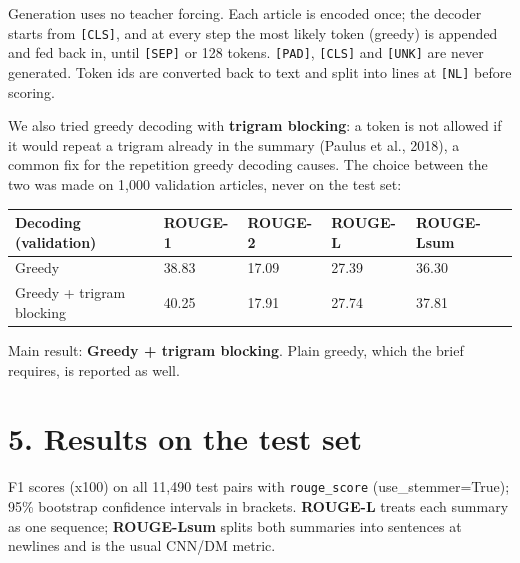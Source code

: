 \documentclass[10pt,a4paper]{article}
\begin{document}
Generation uses no teacher forcing. Each article is encoded once; the decoder starts from \texttt{{[}CLS{]}}, and at every step the most likely token (greedy) is appended and fed back in, until \texttt{{[}SEP{]}} or 128 tokens. \texttt{{[}PAD{]}}, \texttt{{[}CLS{]}} and \texttt{{[}UNK{]}} are never generated. Token ids are converted back to text and split into lines at \texttt{{[}NL{]}} before scoring.

We also tried greedy decoding with \textbf{trigram blocking}: a token is not allowed if it would repeat a trigram already in the summary (Paulus et al., 2018), a common fix for the repetition greedy decoding causes. The choice between the two was made on 1,000 validation articles, never on the test set:

\begin{longtable}[]{@{}lllll@{}}
\toprule\noalign{}
Decoding (validation) & ROUGE-1 & ROUGE-2 & ROUGE-L & ROUGE-Lsum \\
\midrule\noalign{}
\endhead
\bottomrule\noalign{}
\endlastfoot
Greedy & 38.83 & 17.09 & 27.39 & 36.30 \\
Greedy + trigram blocking & 40.25 & 17.91 & 27.74 & 37.81 \\
\end{longtable}

Main result: \textbf{Greedy + trigram blocking}. Plain greedy, which the brief requires, is reported as well.

\hypertarget{results-on-the-test-set}{%
\section{5. Results on the test set}\label{results-on-the-test-set}}

F1 scores (x100) on all 11,490 test pairs with \texttt{rouge\_score} (use\_stemmer=True); 95\% bootstrap confidence intervals in brackets. \textbf{ROUGE-L} treats each summary as one sequence; \textbf{ROUGE-Lsum} splits both summaries into sentences at newlines and is the usual CNN/DM metric.
\end{document}
